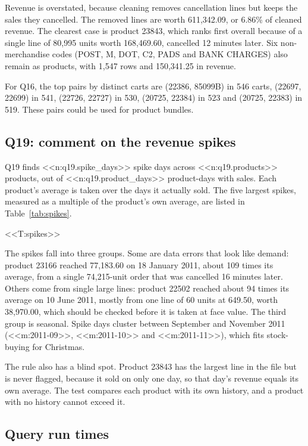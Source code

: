\documentclass[11pt,a4paper]{article}
\begin{document}
Revenue is overstated, because cleaning removes cancellation lines but keeps the sales they cancelled. The removed lines are worth 611,342.09, or 6.86\% of cleaned revenue. The clearest case is product 23843, which ranks first overall because of a single line of 80,995 units worth 168,469.60, cancelled 12 minutes later. Six non-merchandise codes (POST, M, DOT, C2, PADS and BANK CHARGES) also remain as products, with 1,547 rows and 150,341.25 in revenue.

For Q16, the top pairs by distinct carts are (22386, 85099B) in 546 carts, (22697, 22699) in 541, (22726, 22727) in 530, (20725, 22384) in 523 and (20725, 22383) in 519. These pairs could be used for product bundles.

\subsection{Q19: comment on the revenue spikes}

Q19 finds <<n:q19.spike_days>> spike days across <<n:q19.products>> products, out of <<n:q19.product_days>> product-days with sales. Each product's average is taken over the days it actually sold. The five largest spikes, measured as a multiple of the product's own average, are listed in Table~\ref{tab:spikes}.

<<T:spikes>>

The spikes fall into three groups. Some are data errors that look like demand: product 23166 reached 77,183.60 on 18 January 2011, about 109 times its average, from a single 74,215-unit order that was cancelled 16 minutes later. Others come from single large lines: product 22502 reached about 94 times its average on 10 June 2011, mostly from one line of 60 units at 649.50, worth 38,970.00, which should be checked before it is taken at face value. The third group is seasonal. Spike days cluster between September and November 2011 (<<m:2011-09>>, <<m:2011-10>> and <<m:2011-11>>), which fits stock-buying for Christmas.

The rule also has a blind spot. Product 23843 has the largest line in the file but is never flagged, because it sold on only one day, so that day's revenue equals its own average. The test compares each product with its own history, and a product with no history cannot exceed it.

\subsection{Query run times}
\end{document}
